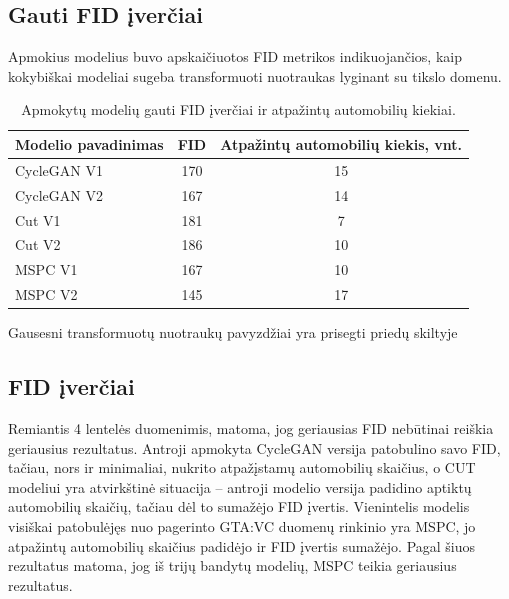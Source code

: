 \documentclass{VUMIFPSkursinis}
\begin{document}
        \subsection*{Gauti FID įverčiai}
            Apmokius modelius buvo apskaičiuotos FID metrikos indikuojančios, kaip kokybiškai modeliai sugeba transformuoti nuotraukas lyginant su tikslo domenu.
            \begin{table}[H]
                \footnotesize
                \centering
                \caption{Apmokytų modelių gauti FID įverčiai ir atpažintų automobilių kiekiai.}
                {\begin{tabular}{|l|c|c|} \hline
                    Modelio pavadinimas & FID & Atpažintų automobilių kiekis, vnt.\\
                    \hline
                    CycleGAN V1 & 170 & 15\\
                    CycleGAN V2 & 167 & 14\\
                    Cut V1 & 181 & 7\\
                    Cut V2 & 186 & 10\\ 
                    MSPC V1 & 167 & 10\\
                    MSPC V2 & 145 & 17\\
                    \hline
                    \end{tabular}
                }
                \label{tab:table example}
            \end{table}
    Gausesni transformuotų nuotraukų pavyzdžiai yra prisegti priedų skiltyje 
    \subsection*{FID įverčiai}
        Remiantis 4 lentelės duomenimis, matoma, jog geriausias FID nebūtinai reiškia geriausius rezultatus. Antroji apmokyta CycleGAN versija patobulino savo FID, tačiau, nors ir minimaliai, nukrito atpažįstamų automobilių skaičius, o CUT modeliui yra atvirkštinė situacija – antroji modelio versija padidino aptiktų automobilių skaičių, tačiau dėl to sumažėjo FID įvertis. Vienintelis modelis visiškai patobulėjęs nuo pagerinto GTA:VC duomenų rinkinio yra MSPC, jo atpažintų automobilių skaičius padidėjo ir FID įvertis sumažėjo. Pagal šiuos rezultatus matoma, jog iš trijų bandytų modelių, MSPC teikia geriausius rezultatus.
\end{document}
